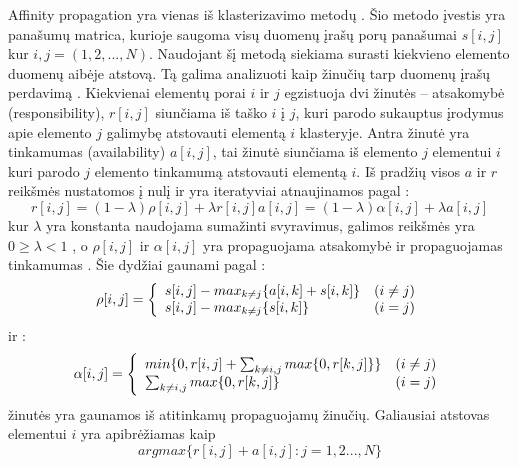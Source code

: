 Affinity propagation yra vienas iš klasterizavimo metodų \cite{comp}. Šio metodo įvestis yra panašumų matrica, kurioje saugoma visų duomenų įrašų porų panašumai $s[i, j]$ kur $i, j =  (1,  2, ..., N)$. Naudojant šį metodą siekiama surasti kiekvieno elemento duomenų aibėje atstovą. Tą galima analizuoti kaip žinučių tarp duomenų įrašų perdavimą \cite{fastprop}. Kiekvienai elementų porai $i$ ir $j$ egzistuoja dvi žinutės -- atsakomybė (responsibility), $r[i, j]$ siunčiama iš taško $i$ į $j$, kuri parodo sukauptus įrodymus apie elemento $j$ galimybę atstovauti elementą $i$ klasteryje.  Antra žinutė yra tinkamumas (availability) $a[i, j]$, tai žinutė siunčiama iš elemento $j$ elementui $i$ kuri parodo $j$ elemento tinkamumą atstovauti elementą $i$. Iš pradžių visos $a$ ir $r$ reikšmės nustatomos į nulį ir yra iteratyviai atnaujinamos pagal \cite{fastprop}:
 \begin{equation}
    r[i, j] = (1 - \lambda)\rho[i, j] + \lambda r[i, j]
    a[i, j] = (1 - \lambda)\alpha[i, j] + \lambda a[i, j]
 \end{equation}
 kur $\lambda$ yra konstanta naudojama sumažinti svyravimus, galimos reikšmės yra $ 0 \geq \lambda < 1 $ , o $\rho[i, j]$ ir  $\alpha[i, j]$ yra propaguojama atsakomybė ir propaguojamas tinkamumas \cite{fastprop}. Šie dydžiai gaunami pagal \cite{fastprop}:
 \begin{equation}
   \rho[i, j]=\left\{
                  \begin{array}{l r}
                    s[i,j] - max_{k \neq j} \{ {a[i, k] + s[i, k]} \} & (i \neq j) \\
                    s[i,j] - max_{k \neq j} \{ {s[i, k]} \} & (i = j) \\
                  \end{array}
                \right.
 \end{equation}
   ir \cite{fastprop}:
\begin{equation}
    \alpha[i, j] =  \left\{
         \begin{array}{l r}
            min \{ 0, r[i, j] + \sum_{k \neq i,j} max \{ 0, r[k, j] \} \}         & (i \neq j) \\
            \sum_{k \neq i,j} max \{ 0, r[k, j] \}  & (i = j) \\
         \end{array}
       \right.
\end{equation}
žinutės yra gaunamos iš atitinkamų propaguojamų žinučių. Galiausiai atstovas elementui $i$ yra apibrėžiamas kaip \cite{fastprop}
\begin{equation}
    argmax \{r[i, j] + a[i, j] : j = 1, 2 ..., N \}
\end{equation}

